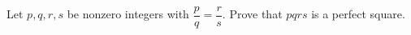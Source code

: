 Let $p,q,r,s$ be nonzero integers with $\dfrac pq=\dfrac rs$. Prove that $pqrs$ is a perfect square.

